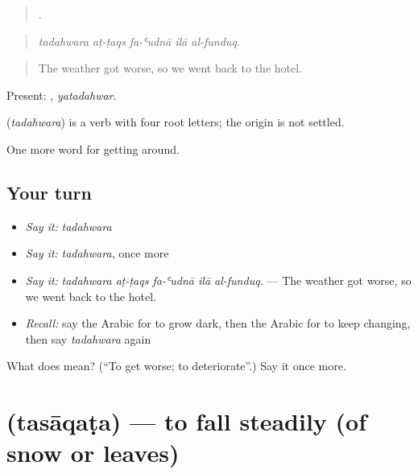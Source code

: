 \begin{quote}
    .
\end{quote}

\begin{quote}
\emph{tadahwara aṭ-ṭaqs fa-ʿudnā ilā al-funduq.}
\end{quote}

\begin{quote}
The weather got worse, so we went back to the hotel.
\end{quote}

Present: , \emph{yatadahwar}.

\begin{cousinweb}
\textbf{} (\emph{tadahwara}) is a verb with four root letters; the origin is not settled.
\end{cousinweb}

\begin{grammarlens}[title={What you've built}]
One more word for getting around.
\end{grammarlens}

\subsection*{Your turn}
\begin{itemize}
\raggedright
  \item \emph{Say it:} \emph{tadahwara}
  \item \emph{Say it:} \emph{tadahwara}, once more
  \item \emph{Say it:} \emph{tadahwara aṭ-ṭaqs fa-ʿudnā ilā al-funduq.} — The weather got worse, so we went back to the hotel.
  \item \emph{Recall:} say the Arabic for to grow dark, then the Arabic for to keep changing, then say \emph{tadahwara} again
\end{itemize}

\begin{tcolorbox}[breakable,colback=teal!4,colframe=teal!35!black,title={Before you move on}]
What does  mean? (\textquotedblleft{}To get worse; to deteriorate\textquotedblright{}.) Say it once more.
\end{tcolorbox}
\section[\texorpdfstring{\ar{تساقط} (tasāqaṭa)}{تساقط (tasāqaṭa)}]{ (tasāqaṭa) — to fall steadily (of snow or leaves)}

